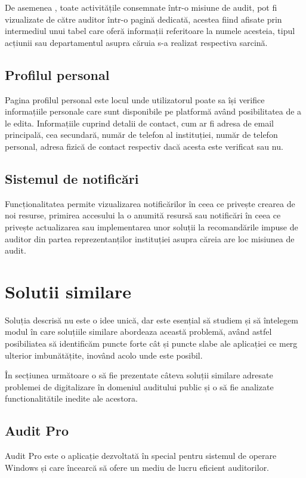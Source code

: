 	 De asemenea , toate activitățile consemnate într-o misiune de audit, pot fi vizualizate de către auditor într-o pagină dedicată, acestea fiind afisate prin intermediul unui tabel care oferă informații referitoare la numele acesteia, tipul acțiunii sau departamentul asupra căruia s-a realizat respectiva sarcină.
	 
	
	\subsection{Profilul personal}
	Pagina profilul personal este locul unde utilizatorul poate sa își verifice informațiile personale care sunt disponibile pe platformă având posibilitatea de a le edita. Informațiile cuprind detalii de contact, cum ar fi adresa de email principală, cea secundară, număr de telefon al instituției, număr de telefon personal, adresa fizică de contact respectiv dacă acesta este verificat sau nu.
 
	
	\subsection{Sistemul de notificări}
		Funcționalitatea permite vizualizarea notificărilor în ceea ce privește crearea de noi resurse, primirea accesului la o anumită resursă sau notificări în ceea ce privește actualizarea sau implementarea unor soluții la recomandările impuse de auditor din partea reprezentanților instituției asupra căreia are loc misiunea de audit.


	\section{Solutii similare}
	Soluția descrisă nu este o idee unică, dar este esențial să studiem și să întelegem modul în care soluțiile similare abordeaza această problemă, având astfel posibiliatea să identificăm puncte forte cât și puncte slabe ale aplicației ce merg ulterior imbunătățite, inovând acolo unde este posibil.
	
	În secțiunea următoare o să fie prezentate câteva soluții similare adresate problemei de digitalizare în domeniul auditului public și o să fie analizate functionalitătile inedite ale acestora. 
	
	\subsection*{Audit Pro}
	
	Audit Pro este o aplicație dezvoltată în special pentru sistemul de operare Windows și care încearcă să ofere un mediu de lucru eficient auditorilor.
	
